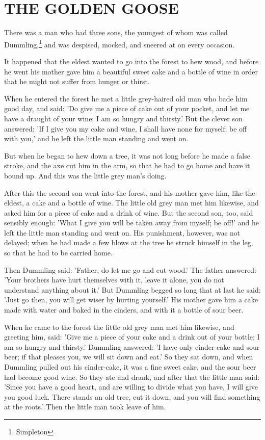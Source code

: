 \documentclass[12pt]{book}
\begin{document}
\chapter{THE GOLDEN GOOSE}

There was a man who had three sons, the youngest of whom was called
Dummling,\footnote{Simpleton} and was despised, mocked, and sneered at on every
occasion.

It happened that the eldest wanted to go into the forest to hew wood,
and before he went his mother gave him a beautiful sweet cake and a
bottle of wine in order that he might not suffer from hunger or
thirst.

When he entered the forest he met a little grey-haired old man who
bade him good day, and said: 'Do give me a piece of cake out of your
pocket, and let me have a draught of your wine; I am so hungry and
thirsty.' But the clever son answered: 'If I give you my cake and
wine, I shall have none for myself; be off with you,' and he left the
little man standing and went on.

But when he began to hew down a tree, it was not long before he made a
false stroke, and the axe cut him in the arm, so that he had to go
home and have it bound up. And this was the little grey man's doing.

After this the second son went into the forest, and his mother gave
him, like the eldest, a cake and a bottle of wine. The little old grey
man met him likewise, and asked him for a piece of cake and a drink of
wine. But the second son, too, said sensibly enough: 'What I give you
will be taken away from myself; be off!' and he left the little man
standing and went on. His punishment, however, was not delayed; when
he had made a few blows at the tree he struck himself in the leg, so
that he had to be carried home.

Then Dummling said: 'Father, do let me go and cut wood.' The father
answered: 'Your brothers have hurt themselves with it, leave it alone,
you do not understand anything about it.' But Dummling begged so long
that at last he said: 'Just go then, you will get wiser by hurting
yourself.' His mother gave him a cake made with water and baked in the
cinders, and with it a bottle of sour beer.

When he came to the forest the little old grey man met him likewise,
and greeting him, said: 'Give me a piece of your cake and a drink out
of your bottle; I am so hungry and thirsty.' Dummling answered: 'I
have only cinder-cake and sour beer; if that pleases you, we will sit
down and eat.' So they sat down, and when Dummling pulled out his
cinder-cake, it was a fine sweet cake, and the sour beer had become
good wine. So they ate and drank, and after that the little man said:
'Since you have a good heart, and are willing to divide what you have,
I will give you good luck. There stands an old tree, cut it down, and
you will find something at the roots.' Then the little man took leave
of him.
\end{document}
